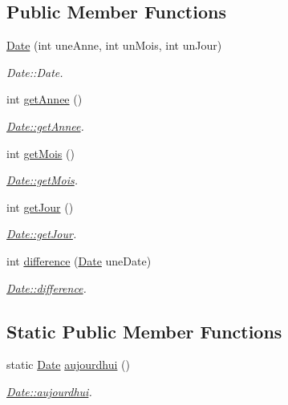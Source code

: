 \subsection*{Public Member Functions}
\begin{DoxyCompactItemize}
\item 
\hyperlink{class_date_a2e0c4707435a4c3390e138b9ac6ee3f5}{Date} (int une\+Anne, int un\+Mois, int un\+Jour)
\begin{DoxyCompactList}\small\item\em Date\+::\+Date. \end{DoxyCompactList}\item 
int \hyperlink{class_date_a99c5677274bdaffadaedad4c888ccbca}{get\+Annee} ()
\begin{DoxyCompactList}\small\item\em \hyperlink{class_date_a99c5677274bdaffadaedad4c888ccbca}{Date\+::get\+Annee}. \end{DoxyCompactList}\item 
int \hyperlink{class_date_a6b16211abaa2c22418e82b8cd9d08bfe}{get\+Mois} ()
\begin{DoxyCompactList}\small\item\em \hyperlink{class_date_a6b16211abaa2c22418e82b8cd9d08bfe}{Date\+::get\+Mois}. \end{DoxyCompactList}\item 
int \hyperlink{class_date_a961e64bff2fdff7ee95bc335ca400d2f}{get\+Jour} ()
\begin{DoxyCompactList}\small\item\em \hyperlink{class_date_a961e64bff2fdff7ee95bc335ca400d2f}{Date\+::get\+Jour}. \end{DoxyCompactList}\item 
int \hyperlink{class_date_a45f1086b5028cdc71f7645f0a91d7731}{difference} (\hyperlink{class_date}{Date} une\+Date)
\begin{DoxyCompactList}\small\item\em \hyperlink{class_date_a45f1086b5028cdc71f7645f0a91d7731}{Date\+::difference}. \end{DoxyCompactList}\end{DoxyCompactItemize}
\subsection*{Static Public Member Functions}
\begin{DoxyCompactItemize}
\item 
static \hyperlink{class_date}{Date} \hyperlink{class_date_a4712c0d9ecfeb49472a847a905f62150}{aujourdhui} ()
\begin{DoxyCompactList}\small\item\em \hyperlink{class_date_a4712c0d9ecfeb49472a847a905f62150}{Date\+::aujourdhui}. \end{DoxyCompactList}\end{DoxyCompactItemize}


